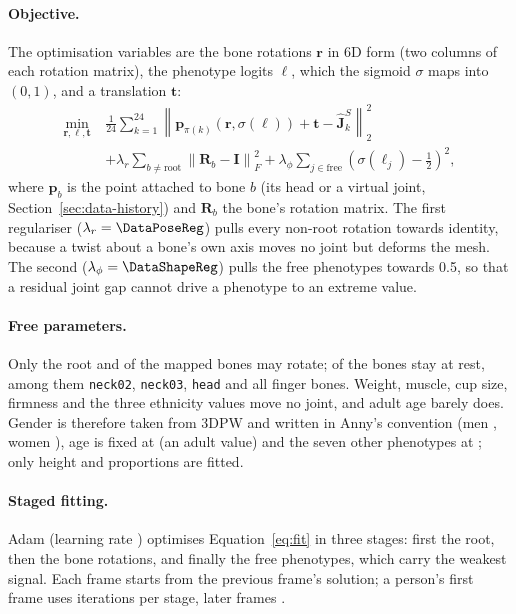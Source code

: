 \paragraph{Objective.} The optimisation variables are the \DataBones{} bone rotations $\mathbf{r}$ in 6D form (two
columns of each rotation matrix), the phenotype logits $\boldsymbol{\ell}$, which the sigmoid $\sigma$ maps into
$(0,1)$, and a translation $\mathbf{t}$:
\begin{equation}
\begin{split}
\min_{\mathbf{r},\boldsymbol{\ell},\mathbf{t}}\
 & \frac{1}{24}\sum_{k=1}^{24}
   \left\| \mathbf{p}_{\pi(k)}\!\left(\mathbf{r},\sigma(\boldsymbol{\ell})\right)
   + \mathbf{t} - \hat{\mathbf{J}}^{S}_{k}\right\|_2^2 \\
 & + \lambda_{r}\sum_{b\neq\text{root}}\left\|\mathbf{R}_b-\mathbf{I}\right\|_F^2
   + \lambda_{\phi}\sum_{j\in\text{free}}\left(\sigma(\ell_j)-\tfrac12\right)^2 ,
\end{split}
\label{eq:fit}
\end{equation}
where $\mathbf{p}_{b}$ is the point attached to bone $b$ (its head or a virtual joint, Section~\ref{sec:data-history})
and $\mathbf{R}_b$ the bone's rotation matrix. The first regulariser ($\lambda_r = \DataPoseReg$) pulls every non-root
rotation towards identity, because a twist about a bone's own axis moves no joint but deforms the mesh. The second
($\lambda_\phi = \DataShapeReg$) pulls the free phenotypes towards 0.5, so that a residual joint gap cannot drive a
phenotype to an extreme value.

\paragraph{Free parameters.} Only the root and \DataFittedBones{} of the \DataMappedBones{} mapped bones may rotate;
\DataRestBones{} of the \DataBones{} bones stay at rest, among them \texttt{neck02}, \texttt{neck03}, \texttt{head}
and all finger bones. Weight, muscle, cup size, firmness and the three ethnicity values move no joint, and adult age
barely does. Gender is therefore taken from 3DPW and
written in Anny's convention (men \DataGenderMale, women \DataGenderFemale), age is fixed at \DataFixedAge{} (an
adult value) and the seven other phenotypes at \DataFixedNeutral; only height and proportions are fitted.

\paragraph{Staged fitting.} Adam (learning rate \DataFitLr) optimises Equation~\ref{eq:fit} in three stages: first
the root, then the bone rotations, and finally the free phenotypes, which carry the weakest signal. Each frame starts
from the previous frame's solution; a person's first frame uses \DataColdIters{} iterations per
stage, later frames \DataWarmIters.

